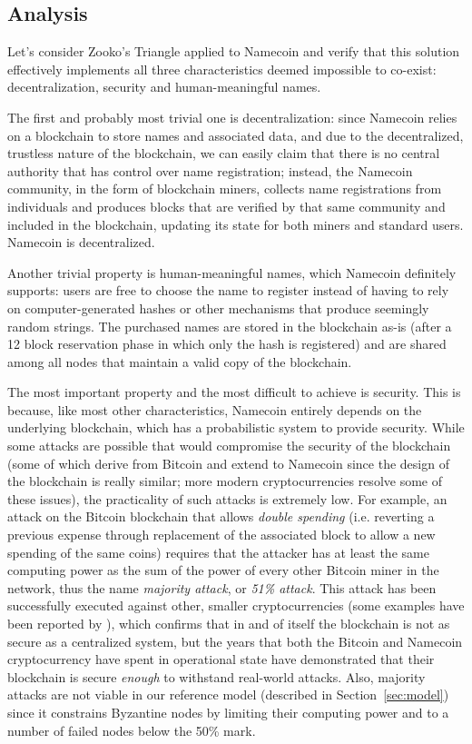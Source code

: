\documentclass[mscthesis]{usiinfthesis}
\begin{document}
\subsection{Analysis}
Let's consider Zooko's Triangle applied to Namecoin and verify that this solution effectively implements all three characteristics deemed impossible to co-exist: decentralization, security and human-meaningful names.

The first and probably most trivial one is decentralization: since Namecoin relies on a blockchain to store names and associated data, and due to the decentralized, trustless nature of the blockchain, we can easily claim that there is no central authority that has control over name registration; instead, the Namecoin community, in the form of blockchain miners, collects name registrations from individuals and produces blocks that are verified by that same community and included in the blockchain, updating its state for both miners and standard users. Namecoin is decentralized.

Another trivial property is human-meaningful names, which Namecoin definitely supports: users are free to choose the name to register instead of having to rely on computer-generated hashes or other mechanisms that produce seemingly random strings. The purchased names are stored in the blockchain as-is (after a 12 block reservation phase in which only the hash is registered) and are shared among all nodes that maintain a valid copy of the blockchain.

The most important property and the most difficult to achieve is security. This is because, like most other characteristics, Namecoin entirely depends on the underlying blockchain, which has a probabilistic system to provide security. While some attacks are possible that would compromise the security of the blockchain (some of which derive from Bitcoin and extend to Namecoin since the design of the blockchain is really similar; more modern cryptocurrencies resolve some of these issues), the practicality of such attacks is extremely low. For example, an attack on the Bitcoin blockchain that allows \emph{double spending} (i.e. reverting a previous expense through replacement of the associated block to allow a new spending of the same coins) requires that the attacker has at least the same computing power as the sum of the power of every other Bitcoin miner in the network, thus the name \emph{majority attack}, or \emph{51\% attack}. This attack has been successfully executed against other, smaller cryptocurrencies (some examples have been reported by \cite{website:realwordmajorityattacks}), which confirms that in and of itself the blockchain is not as secure as a centralized system, but the years that both the Bitcoin and Namecoin cryptocurrency have spent in operational state have demonstrated that their blockchain is secure \emph{enough} to withstand real-world attacks. Also, majority attacks are not viable in our reference model (described in Section~\ref{sec:model}) since it constrains Byzantine nodes by limiting their computing power and to a number of failed nodes below the 50\% mark.
\end{document}
